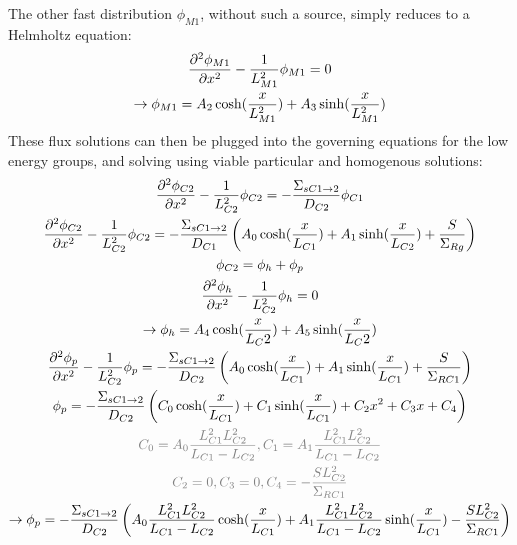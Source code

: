 \documentclass[11pt]{article} %
\begin{document}
The other fast distribution $\phi_{M1}$, without such a source, simply reduces to a Helmholtz equation:
\begin{equation}
    \begin{gathered}
        \frac{\partial^{2}\phi_{M1}}{\partial{x}^{2}} - \frac{1}{L_{M1}^2}\phi_{M1} = 0\\
        \rightarrow\phi_{M1} = A_2\cosh(\frac{x}{L_{M1}^2}) + A_3\sinh(\frac{x}{L_{M1}^2}) \\
    \end{gathered}
    \label{eq:m1_flux}
\end{equation}
These flux solutions can then be plugged into the governing equations for the low energy groups, and solving using viable particular and homogenous solutions:
\begin{equation}
    \begin{gathered}
        \pd{\phi_{C2}}{x}{2} - \frac{1}{L_{C2}^2}\phi_{C2} = -\frac{\Sigma_{sC1\rightarrow2}}{D_{C2}}\phi_{C1}\\
        \pd{\phi_{C2}}{x}{2} - \frac{1}{L_{C2}^2}\phi_{C2} = -\frac{\Sigma_{sC1\rightarrow2}}{D_{C1}}\left(A_0\cosh(\frac{x}{L_{C1}}) + A_1\sinh(\frac{x}{L_{C2}}) + \frac{S}{\SigRem}\right)\\
        \phi_{C2} = \phi_h + \phi_p\\
        \pd{\phi_h}{x}{2} - \frac{1}{L_{C2}^2}\phi_h = 0\\
        \rightarrow\phi_h = A_4\cosh(\frac{x}{L_C2}) + A_5\sinh(\frac{x}{L_C2})\\
        \pd{\phi_p}{x}{2} - \frac{1}{L_{C2}^2}\phi_p = -\frac{\Sigma_{sC1\rightarrow2}}{D_{C2}}\left(A_0\cosh(\frac{x}{L_{C1}}) + A_1\sinh(\frac{x}{L_{C1}}) + \frac{S}{\SigR{C1}}\right)\\
        \phi_p = -\frac{\Sigma_{sC1\rightarrow2}}{D_{C2}}\left(C_0\cosh(\frac{x}{L_{C1}}) + C_1\sinh(\frac{x}{L_{C1}}) + C_2x^2 + C_3x + C_4\right)\\
        \color{gray}C_0=A_0\frac{L_{C1}^2L_{C2}^2}{L_{C1}-L_{C2}}, C_1=A_1\frac{L_{C1}^2L_{C2}^2}{L_{C1}-L_{C2}}\\
        \color{gray}C_2=0,C_3=0,C_4=-\frac{SL_{C2}^2}{\SigR{C1}}\\
        \rightarrow\phi_p = -\frac{\Sigma_{sC1\rightarrow2}}{D_{C2}}\left(A_0\frac{L_{C1}^2L_{C2}^2}{L_{C1}-L_{C2}}\cosh(\frac{x}{L_{C1}}) + A_1\frac{L_{C1}^2L_{C2}^2}{L_{C1}-L_{C2}}\sinh(\frac{x}{L_{C1}})-\frac{SL_{C2}^2}{\SigR{C1}}\right)\\
    \end{gathered}
\end{equation}
\end{document}
